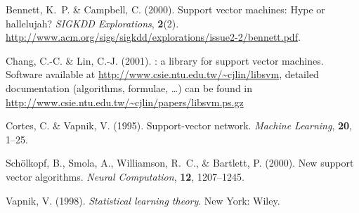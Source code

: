 \documentclass[a4paper]{article}
\begin{document}
\begin{thebibliography}{5}

Bennett, K.~P. \& Campbell, C. (2000).
\newblock Support vector machines: Hype or hallelujah?
\newblock \emph{SIGKDD Explorations}, \textbf{2}(2).
\newblock
  \url{http://www.acm.org/sigs/sigkdd/explorations/issue2-2/bennett.pdf}.

Chang, C.-C. \& Lin, C.-J. (2001).
: a library for support vector machines.
\newblock Software available at
\url{http://www.csie.ntu.edu.tw/~cjlin/libsvm}, detailed documentation
(algorithms, formulae, \dots) can be found
in \url{http://www.csie.ntu.edu.tw/~cjlin/papers/libsvm.ps.gz}

Cortes, C. \& Vapnik, V. (1995).
\newblock Support-vector network.
\newblock \emph{Machine Learning}, \textbf{20}, 1--25.

Sch\"olkopf, B., Smola, A., Williamson, R.~C., \& Bartlett, P. (2000).
\newblock New support vector algorithms.
\newblock \emph{Neural Computation}, \textbf{12}, 1207--1245.

Vapnik, V. (1998).
\newblock \emph{Statistical learning theory}.
\newblock New York: Wiley.

\end{thebibliography}
\end{document}
